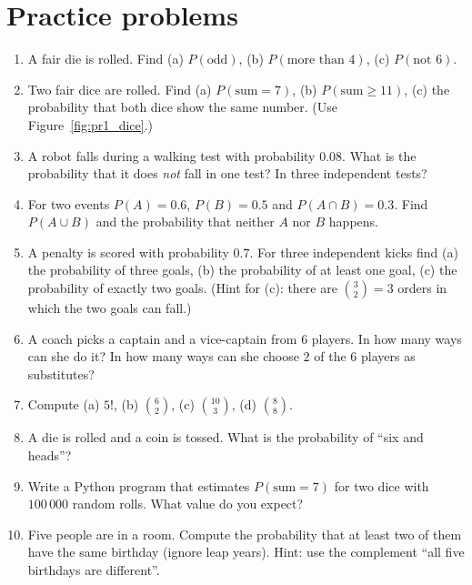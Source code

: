 \section*{Practice problems}
\begin{enumerate}[label=\textbf{\thechapter.\arabic*}]
  \item A fair die is rolled. Find (a) $P(\text{odd})$, (b) $P(\text{more than }4)$, (c) $P(\text{not }6)$.
  \item Two fair dice are rolled. Find (a) $P(\text{sum}=7)$, (b) $P(\text{sum}\ge11)$, (c) the probability that both dice show the same number. (Use Figure~\ref{fig:pr1_dice}.)
  \item A robot falls during a walking test with probability $0.08$. What is the probability that it does \emph{not} fall in one test? In three independent tests?
  \item For two events $P(A)=0.6$, $P(B)=0.5$ and $P(A\cap B)=0.3$. Find $P(A\cup B)$ and the probability that neither $A$ nor $B$ happens.
  \item A penalty is scored with probability $0.7$. For three independent kicks find (a) the probability of three goals, (b) the probability of at least one goal, (c) the probability of exactly two goals. (Hint for (c): there are $\binom32=3$ orders in which the two goals can fall.)
  \item A coach picks a captain and a vice-captain from $6$ players. In how many ways can she do it? In how many ways can she choose $2$ of the $6$ players as substitutes?
  \item Compute (a) $5!$, (b) $\binom{6}{2}$, (c) $\binom{10}{3}$, (d) $\binom{8}{8}$.
  \item A die is rolled and a coin is tossed. What is the probability of ``six and heads''?
  \item Write a Python program that estimates $P(\text{sum}=7)$ for two dice with $100\,000$ random rolls. What value do you expect?
  \item[\textbf{\thechapter.10}$\star$] Five people are in a room. Compute the probability that at least two of them have the same birthday (ignore leap years). Hint: use the complement ``all five birthdays are different''.
\end{enumerate}
